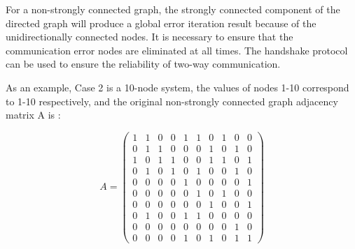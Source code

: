 \documentclass[conference]{IEEEtran}
\begin{document}
For a non-strongly connected graph, the strongly connected component of the directed graph will produce a global error iteration result because of the unidirectionally connected nodes. It is necessary to ensure that the communication error nodes are eliminated at all times. The handshake protocol can be used to ensure the reliability of two-way communication.

As an example, Case 2 is a 10-node system, the values of nodes 1-10 correspond to 1-10 respectively, and the original non-strongly connected graph adjacency matrix A is :

\begin{equation}
    A=\left(\begin{array}{cccccccccc}
    1 & 1 & 0 & 0 & 1 & 1 & 0 & 1 & 0 & 0 \\
    0 & 1 & 1 & 0 & 0 & 0 & 1 & 0 & 1 & 0 \\
    1 & 0 & 1 & 1 & 0 & 0 & 1 & 1 & 0 & 1 \\
    0 & 1 & 0 & 1 & 0 & 1 & 0 & 0 & 1 & 0 \\
    0 & 0 & 0 & 0 & 1 & 0 & 0 & 0 & 0 & 1 \\
    0 & 0 & 0 & 0 & 0 & 1 & 0 & 1 & 0 & 0 \\
    0 & 0 & 0 & 0 & 0 & 0 & 1 & 0 & 0 & 1 \\
    0 & 1 & 0 & 0 & 1 & 1 & 0 & 0 & 0 & 0 \\
    0 & 0 & 0 & 0 & 0 & 0 & 0 & 0 & 1 & 0 \\
    0 & 0 & 0 & 0 & 1 & 0 & 1 & 0 & 1 & 1
    \end{array}\right)
\end{equation}

\end{document}

